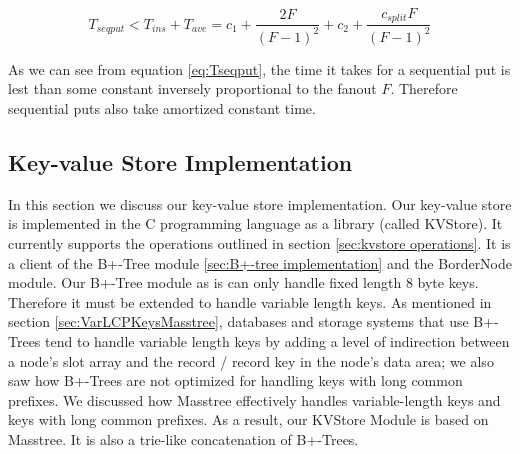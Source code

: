 \begin{equation} \label{eq:Tseqput}
    T_{seqput} < T_{ins} + T_{ave} = c_1 + \frac{2F}{(F-1)^2} + c_2 + \frac{c_{split}F}{(F-1)^2} 
\end{equation}


As we can see from equation \ref{eq:Tseqput}, the time it takes for a sequential put is lest than some constant inversely proportional to the fanout $F$. Therefore sequential puts also take amortized constant time. 

\subsection{Key-value Store Implementation} \label{kvstore implementation}

In this section we discuss our key-value store implementation. Our key-value store is implemented in the C programming language as a library (called KVStore). It currently supports the operations outlined in section \ref{sec:kvstore operations}. It is a client of the B+-Tree module \ref{sec:B+-tree implementation} and the BorderNode module. Our B+-Tree module as is can only handle fixed length 8 byte keys. Therefore it must be extended to handle variable length keys. As mentioned in section \ref{sec:VarLCPKeysMasstree}, databases and storage systems that use B+-Trees tend to handle variable length keys by adding a level of indirection between a node's slot array and the record / record key in the node's data area; we also saw how B+-Trees are not optimized for handling keys with long common prefixes. We discussed how Masstree effectively handles variable-length keys and keys with long common prefixes. As a result, our KVStore Module is based on Masstree. It is also a trie-like concatenation of B+-Trees.

